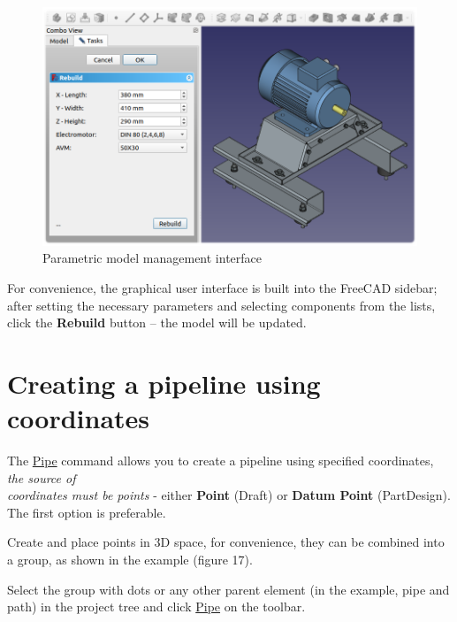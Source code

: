 \documentclass[a4paper,12pt]{article}
\begin{document}
\begin{figure}[htp]
	\centering
	\includegraphics[width=1\textwidth]{img/example_mc.png}
	\caption{Parametric model management interface}
	\label{sec:example_mc}
\end{figure}

For convenience, the graphical user interface is built into the FreeCAD sidebar; after setting the necessary parameters and selecting components from the lists, click the \textbf{Rebuild} button -- the model will be updated.

\pagebreak




\section{Creating a pipeline using coordinates}

The \hyperref[sec:6]{Pipe} command allows you to create a pipeline using specified coordinates, \emph{the source of\\coordinates must be points} - either \textbf{Point} (Draft) or \textbf{Datum Point} (PartDesign). The first option is preferable.

Create and place points in 3D space, for convenience, they can be combined into a group, as shown in the example (figure 17).

Select the group with dots or any other parent element (in the example, pipe and path) in the project tree and click \hyperref[sec:6]{Pipe} on the toolbar.
\end{document}
